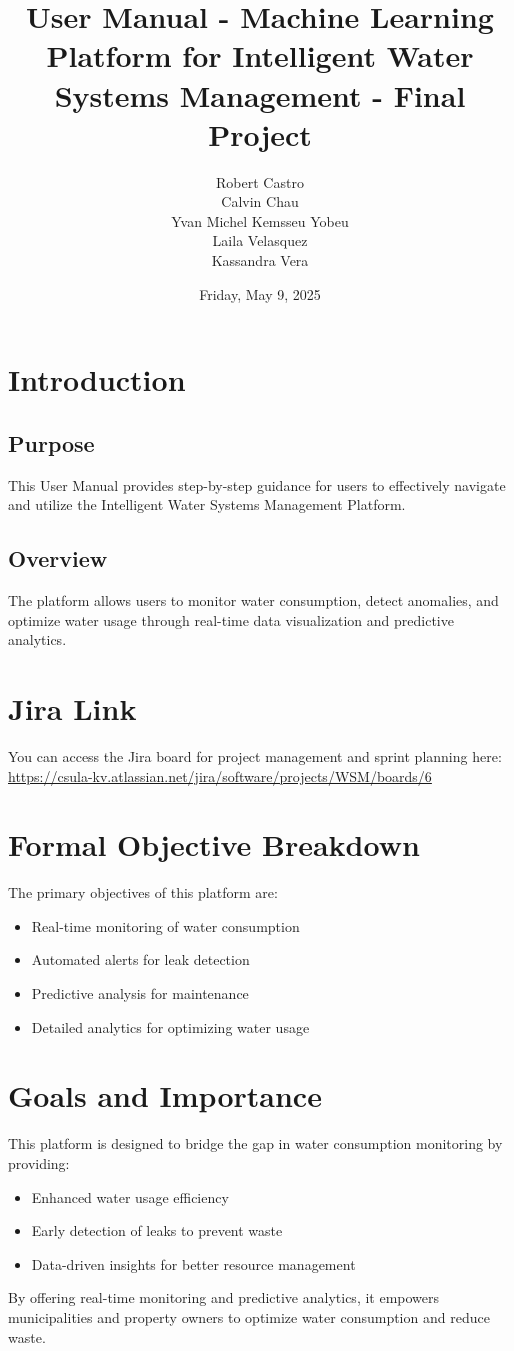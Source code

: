 \documentclass{article}
\title{User Manual - Machine Learning Platform for Intelligent Water Systems Management - Final Project}
\author{Robert Castro\\
Calvin Chau\\
Yvan Michel Kemsseu Yobeu\\
Laila Velasquez\\
Kassandra Vera}
\date{Friday, May 9, 2025}
\begin{document}
\maketitle
\pagebreak
\tableofcontents
\pagebreak

\section{Introduction}
\subsection{Purpose}
This User Manual provides step-by-step guidance for users to effectively navigate and utilize the Intelligent Water Systems Management Platform.

\subsection{Overview}
The platform allows users to monitor water consumption, detect anomalies, and optimize water usage through real-time data visualization and predictive analytics.

\section{Jira Link}
You can access the Jira board for project management and sprint planning here: \url{https://csula-kv.atlassian.net/jira/software/projects/WSM/boards/6}

\section{Formal Objective Breakdown}
The primary objectives of this platform are:
\begin{itemize}
\item Real-time monitoring of water consumption
\item Automated alerts for leak detection
\item Predictive analysis for maintenance
\item Detailed analytics for optimizing water usage
\end{itemize}

\section{Goals and Importance}
This platform is designed to bridge the gap in water consumption monitoring by providing:
\begin{itemize}
\item Enhanced water usage efficiency
\item Early detection of leaks to prevent waste
\item Data-driven insights for better resource management
\end{itemize}
By offering real-time monitoring and predictive analytics, it empowers municipalities and property owners to optimize water consumption and reduce waste.
\end{document}

